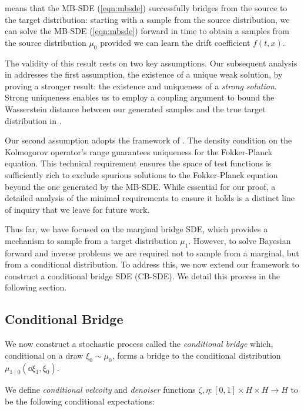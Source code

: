  means that the MB-SDE (\ref{eqn:mbsde}) successfully bridges from the source to the target distribution: starting with a sample from the source distribution, we can solve the MB-SDE (\ref{eqn:mbsde}) forward in time to obtain a samples from the source distribution \(\mu_{0}\) provided we can learn the drift coefficient \(f(t, x)\).

The validity of this result rests on two key assumptions. Our subsequent analysis in  addresses the first assumption, the existence of a unique weak solution, by proving a stronger result: the existence and uniqueness of a \textit{strong solution}. Strong uniqueness enables us to employ a coupling argument to bound the Wasserstein distance between our generated samples and the true target distribution in . %

Our second assumption adopts the framework of \citet[][Theorem 2.1]{bogachev2010uniquenesssolutionsfokkerplanckequations}. The density condition on the Kolmogorov operator's range guarantees uniqueness for the Fokker-Planck equation. This technical requirement ensures the space of test functions is sufficiently rich to exclude spurious solutions to the Fokker-Planck equation beyond the one generated by the MB-SDE. While essential for our proof, a detailed analysis of the minimal requirements to ensure it holds is a distinct line of inquiry that we leave for future work.


Thus far, we have focused on the marginal bridge SDE, which provides a mechanism to sample from a target distribution \(\mu_{1}\). However,  to solve Bayesian forward and inverse problems we are required not to sample from a marginal, but from a conditional distribution. To address this, we now extend our framework to construct a conditional bridge SDE (CB-SDE). We detail this process in the following section.

\subsection{Conditional Bridge}\label{ssec:condbridge}
We now construct a stochastic process called the \textit{conditional bridge} which, conditional on a draw \(\xi_{0} \sim \mu_{0}\), forms a bridge to the conditional distribution \(\mu_{1 \mid 0}(\dd{\xi_{1}}, \xi_{0})\).

We define \textit{conditional velcoity} and \textit{denoiser} functions \(\zeta, \eta: [0, 1] \times H \times H \to H\) to be the following conditional expectations:

